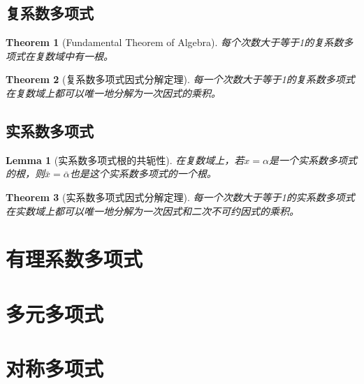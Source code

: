 \documentclass[onecolumn]{ctexart}
\newtheorem{theorem}{Theorem}
\newtheorem{lemma}{Lemma}
\begin{document}
\subsection{复系数多项式}

\begin{theorem}[Fundamental Theorem of Algebra]
  每个次数大于等于1的复系数多项式在复数域中有一根。
\end{theorem}

\begin{theorem}[复系数多项式因式分解定理]
  每一个次数大于等于1的复系数多项式在复数域上都可以唯一地分解为一次因式的乘积。
\end{theorem}

\subsection{实系数多项式}

\begin{lemma}[实系数多项式根的共轭性]
  在复数域上，若$x = \alpha$是一个实系数多项式的根，则$\bar{x} = \bar{\alpha}$也是这个实系数多项式的一个根。
\end{lemma}

\begin{theorem}[实系数多项式因式分解定理]
  每一个次数大于等于1的实系数多项式在实数域上都可以唯一地分解为一次因式和二次不可约因式的乘积。
\end{theorem}
\section{有理系数多项式}

\section{多元多项式}

\section{对称多项式}
\end{document}
